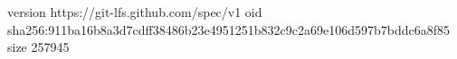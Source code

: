 version https://git-lfs.github.com/spec/v1
oid sha256:911ba16b8a3d7cdff38486b23e4951251b832c9c2a69e106d597b7bddc6a8f85
size 257945
